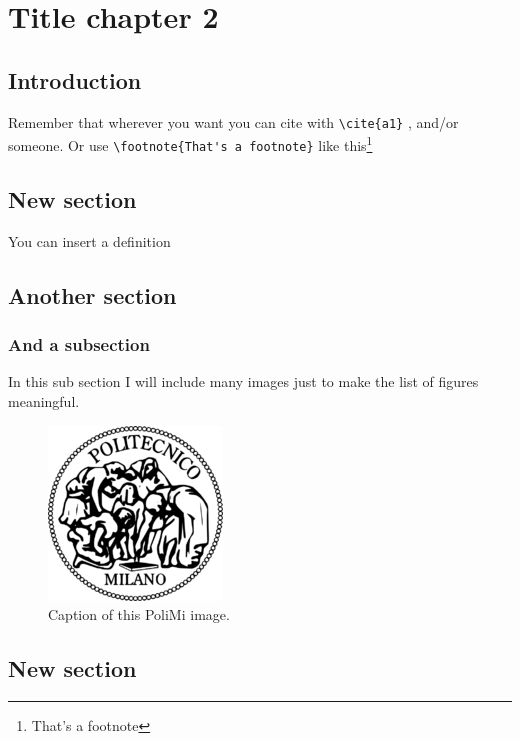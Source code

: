 \chapter{Title chapter 2}

\section{Introduction}\label{sec:i}
Remember that wherever you want you can cite with \verb.\cite{a1}. \cite{a1}, \cite{b1} and/or \cite{m1} someone.
Or use \verb.\footnote{That's a footnote}. like this\footnote{That's a footnote} 


\section{New section}
You can insert a definition

	
\section{Another section}
	\subsection{And a subsection}
		In this sub section I will include many images just to make the list of figures meaningful.

			\begin{figure}[h!tb]
				\centerline {\includegraphics[scale=0.6]{img/logopoli.png}}
				\caption{Caption of this PoliMi image.}
				\label{fig:leet}
			\end{figure}

\section{New section}
